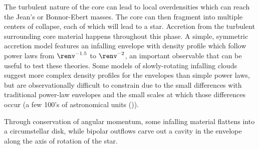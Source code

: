 The turbulent nature of the core can lead to local overdensities which can reach the Jean's or Bonnor-Ebert masses. The core can then fragment into multiple centers of collapse, each of which will lead to a star. Accretion from the turbulent surrounding core material happens throughout this phase. A simple, symmetric accretion model features an infalling envelope with density profile which follow power laws from $\renv^{-1.5}$ to $\renv^{-2}$, an important observable that can be useful to test these theories. Some models of slowly-rotating infalling clouds suggest more complex density profiles for the envelopes \citep[e.g.][]{Ulrich:1976ho,Terebey:1984hi} than simple power laws, but are observationally difficult to constrain due to the small differences with traditional power-law envelopes and the small scales at which those differences occur (a few 100's of astronomical units (\si{\au})).






Through conservation of angular momentum, some infalling material flattens into a circumstellar disk, while bipolar outflows carve out a cavity in the envelope along the axis of rotation of the star. %

